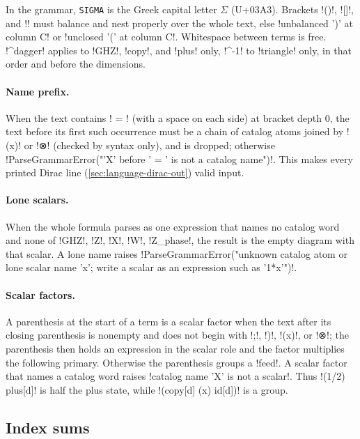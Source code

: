 In the grammar, \texttt{SIGMA} is the Greek capital letter $\Sigma$ (U+03A3). Brackets \code!()!, \code![]!, and \code!{}! must balance and nest properly over the whole text, else \code!unbalanced ')' at column C! or \code!unclosed '(' at column C!. Whitespace between terms is free. \code!^dagger! applies to \code!GHZ!, \code!copy!, and \code!plus! only, \code!^-1! to \code!triangle! only, in that order and before the dimensions.

\paragraph{Name prefix.} When the text contains \code! = ! (with a space on each side) at bracket depth $0$, the text before its first such occurrence must be a chain of catalog atoms joined by \code!(x)! or \code!⊗! (checked by syntax only), and is dropped; otherwise \code!ParseGrammarError("'X' before ' = ' is not a catalog name")!. This makes every printed Dirac line (\cref{sec:language-dirac-out}) valid input.

\paragraph{Lone scalars.} When the whole formula parses as one expression that names no catalog word and none of \code!GHZ!, \code!Z!, \code!X!, \code!W!, \code!Z_phase!, the result is the empty diagram with that scalar. A lone name raises \code!ParseGrammarError("unknown catalog atom or lone scalar name 'x'; write a scalar as an expression such as '1*x'")!.

\paragraph{Scalar factors.} A parenthesis at the start of a term is a scalar factor when the text after its closing parenthesis is nonempty and does not begin with \code!;!, \code!)!, \code!(x)!, or \code!⊗!; the parenthesis then holds an expression in the scalar role and the factor multiplies the following primary. Otherwise the parenthesis groups a \code!feed!. A scalar factor that names a catalog word raises \code!catalog name 'X' is not a scalar!. Thus \code!(1/2) plus[d]! is half the plus state, while \code!(copy[d] (x) id[d])! is a group.

\subsection{Index sums}\label{sec:language-dirac-sums}

